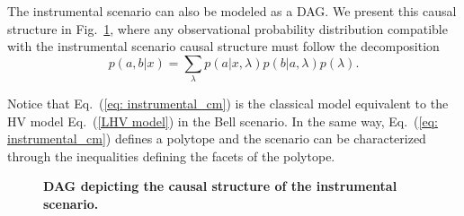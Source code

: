 \documentclass[aps,pra,reprint, superscriptaddress,showkeys]{revtex4-2}
\theoremstyle{plain}
\begin{document}
The instrumental scenario can also be modeled as a DAG. We present this causal structure  in Fig.~\ref{fig:instrumental}, where any  observational probability distribution compatible with the instrumental scenario causal structure must follow the decomposition 
\begin{equation}
p(a,b|x) = \sum_{\lambda} p(a|x, \lambda)p(b|a, \lambda)p(\lambda).\label{eq: instrumental_cm}
\end{equation}


Notice that Eq.~(\ref{eq: instrumental_cm})  is the classical model equivalent to the HV model Eq.~(\ref{LHV model}) in the Bell scenario. In the same way, Eq.~(\ref{eq: instrumental_cm}) defines a polytope and the scenario can be characterized through the inequalities defining the facets of the polytope. 

\begin{figure}[h!]
\centering
{}
\caption{\justifying \textbf{DAG depicting the causal structure of the instrumental scenario.}}
\label{fig:instrumental}
\end{figure}
\end{document}
